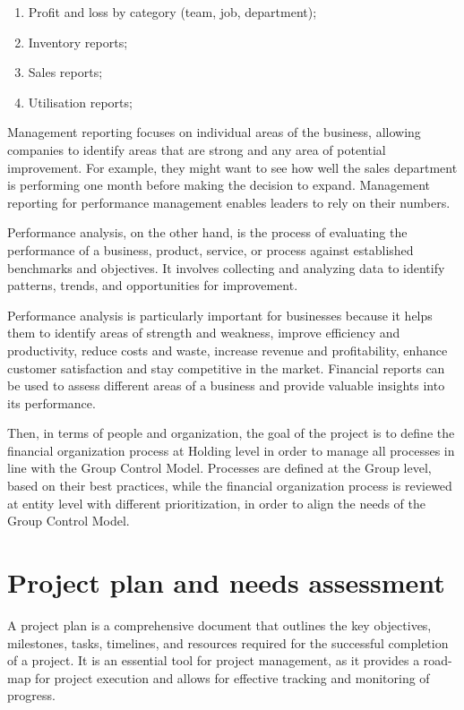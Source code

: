 \documentclass[12pt,a4paper,openright,twoside]{book}
\begin{document}
\begin{enumerate}
    \item Profit and loss by category (team, job, department);
    \item Inventory reports;
    \item Sales reports;
    \item Utilisation reports;
\end{enumerate}

Management reporting focuses on individual areas of the business, allowing companies to identify areas that are strong and any area of potential improvement. 
%
For example, they might want to see how well the sales department is performing one month before making the decision to expand. Management reporting for performance management enables leaders to rely on their numbers.

Performance analysis, on the other hand, is the process of evaluating the performance of a business, product, service, or process against established benchmarks and objectives. 
%
It involves collecting and analyzing data to identify patterns, trends, and opportunities for improvement.

Performance analysis is particularly important for businesses because it helps them to identify areas of strength and weakness, improve efficiency and productivity, reduce costs and waste, increase revenue and profitability, enhance customer satisfaction and stay competitive in the market.
%
Financial reports can be used to assess different areas of a business and provide valuable insights into its performance.

Then, in terms of people and organization, the goal of the project is to define the financial organization process at Holding level in order to manage all processes in line with the Group Control Model.
%
Processes are defined at the Group level, based on their best practices, while the financial organization process is reviewed at entity level with different prioritization, in order to align the needs of the Group Control Model.

\section{Project plan and needs assessment}

A project plan is a comprehensive document that outlines the key objectives, milestones, tasks, timelines, and resources required for the successful completion of a project. 
%
It is an essential tool for project management, as it provides a road-map for project execution and allows for effective tracking and monitoring of progress.
\end{document}
